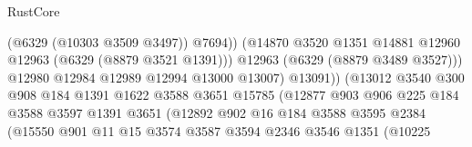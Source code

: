 \begin{lexlean}{RustCore}
\begin{coremodule}
                                              (@6329 (@10303 @3509 @3497))
                                              @7694))
                                          (@14870
                                            @3520
                                            @1351
                                            @14881
                                            @12960
                                            @12963
                                            (@6329 (@8879 @3521 @1391)))
                                          @12963
                                          (@6329 (@8879 @3489 @3527)))
                                        @12980
                                        @12984
                                        @12989
                                        @12994
                                        @13000
                                        @13007)
                                      @13091))
                                  (@13012
                                    @3540
                                    @300
                                    @908
                                    @184
                                    @1391
                                    @1622
                                    @3588
                                    @3651
                                    @15785
                                    (@12877
                                      @903
                                      @906
                                      @225
                                      @184
                                      @3588
                                      @3597
                                      @1391
                                      @3651
                                      (@12892
                                        @902
                                        @16
                                        @184
                                        @3588
                                        @3595
                                        @2384
                                        (@15550
                                          @901
                                          @11
                                          @15
                                          @3574
                                          @3587
                                          @3594
                                          @2346
                                          @3546
                                          @1351
                                          (@10225

\end{coremodule}
\end{lexlean}

